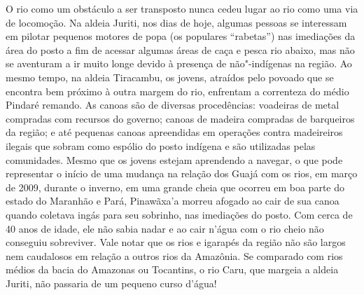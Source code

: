 O rio como um obstáculo a ser transposto nunca cedeu lugar ao rio como
uma via de locomoção. Na aldeia Juriti, nos dias de hoje, algumas
pessoas se interessam em pilotar pequenos motores de popa (os populares
``rabetas'') nas imediações da área do posto a fim de acessar algumas
áreas de caça e pesca rio abaixo, mas não se aventuram a ir muito longe
devido à presença de não"-indígenas na região. Ao mesmo tempo, na aldeia
Tiracambu, os jovens, atraídos pelo povoado que se encontra bem próximo
à outra margem do rio, enfrentam a correnteza do médio Pindaré remando.
As canoas são de diversas procedências: voadeiras de metal compradas com
recursos do governo; canoas de madeira compradas de barqueiros da
região; e até pequenas canoas apreendidas em operações contra
madeireiros ilegais que sobram como espólio do posto indígena e são
utilizadas pelas comunidades. Mesmo que os jovens estejam aprendendo a
navegar, o que pode representar o início de uma mudança na relação dos
Guajá com os rios, em março de 2009, durante o inverno, em uma grande
cheia que ocorreu em boa parte do estado do Maranhão e Pará, Pinawãxa'a
morreu afogado ao cair de sua canoa quando coletava ingás para seu
sobrinho, nas imediações do posto. Com cerca de 40 anos de idade, ele
não sabia nadar e ao cair n'água com o rio cheio não conseguiu
sobreviver. Vale notar que os rios e igarapés da região não são largos
nem caudalosos em relação a outros rios da Amazônia. Se comparado com
rios médios da bacia do Amazonas ou Tocantins, o rio Caru, que margeia a
aldeia Juriti, não passaria de um pequeno curso d'água!

